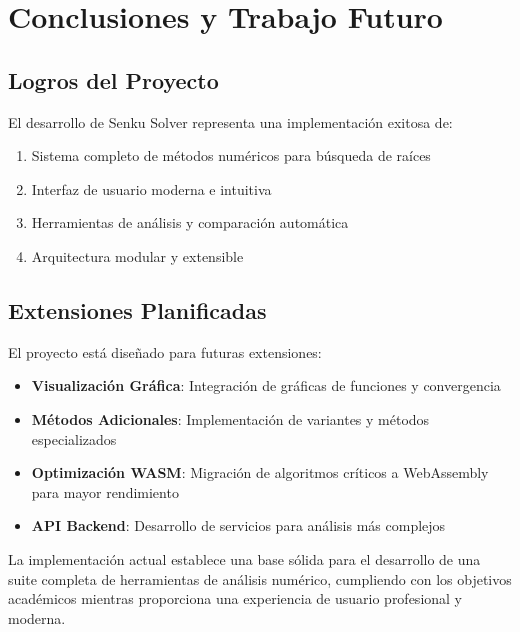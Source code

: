 \section{Conclusiones y Trabajo Futuro}

\subsection{Logros del Proyecto}

El desarrollo de Senku Solver representa una implementación exitosa de:

\begin{enumerate}
    \item Sistema completo de métodos numéricos para búsqueda de raíces
    \item Interfaz de usuario moderna e intuitiva
    \item Herramientas de análisis y comparación automática
    \item Arquitectura modular y extensible
\end{enumerate}

\subsection{Extensiones Planificadas}

El proyecto está diseñado para futuras extensiones:

\begin{itemize}
    \item \textbf{Visualización Gráfica}: Integración de gráficas de funciones y convergencia
    \item \textbf{Métodos Adicionales}: Implementación de variantes y métodos especializados
    \item \textbf{Optimización WASM}: Migración de algoritmos críticos a WebAssembly para mayor rendimiento
    \item \textbf{API Backend}: Desarrollo de servicios para análisis más complejos
\end{itemize}

La implementación actual establece una base sólida para el desarrollo de una suite completa de herramientas de análisis numérico, cumpliendo con los objetivos académicos mientras proporciona una experiencia de usuario profesional y moderna.
